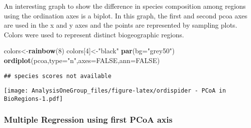 \documentclass[]{article}
\newenvironment{Shaded}{\begin{snugshade}}{\end{snugshade}}
\newcommand{\DataTypeTok}[1]{\textcolor[rgb]{0.13,0.29,0.53}{#1}}
\newcommand{\DecValTok}[1]{\textcolor[rgb]{0.00,0.00,0.81}{#1}}
\newcommand{\FloatTok}[1]{\textcolor[rgb]{0.00,0.00,0.81}{#1}}
\newcommand{\KeywordTok}[1]{\textcolor[rgb]{0.13,0.29,0.53}{\textbf{#1}}}
\newcommand{\NormalTok}[1]{#1}
\newcommand{\OperatorTok}[1]{\textcolor[rgb]{0.81,0.36,0.00}{\textbf{#1}}}
\newcommand{\OtherTok}[1]{\textcolor[rgb]{0.56,0.35,0.01}{#1}}
\newcommand{\StringTok}[1]{\textcolor[rgb]{0.31,0.60,0.02}{#1}}
\begin{document}
An interesting graph to show the difference in species composition among
regions using the ordination axes is a biplot. In this graph, the first
and second pcoa axes are used in the x and y axes and the points are
represented by sampling plots. Colors were used to represent distinct
biogeographic regions.

\begin{Shaded}
\begin{Highlighting}[]
\NormalTok{colors<-}\KeywordTok{rainbow}\NormalTok{(}\DecValTok{8}\NormalTok{)}
\NormalTok{colors[}\DecValTok{4}\NormalTok{]<-}\StringTok{"black"}  
\KeywordTok{par}\NormalTok{(}\DataTypeTok{bg=}\StringTok{"grey50"}\NormalTok{)}
\KeywordTok{ordiplot}\NormalTok{(pcoa,}\DataTypeTok{type=}\StringTok{"n"}\NormalTok{,}\DataTypeTok{axes=}\OtherTok{FALSE}\NormalTok{,}\DataTypeTok{ann=}\OtherTok{FALSE}\NormalTok{)}
\end{Highlighting}
\end{Shaded}

\begin{verbatim}
## species scores not available
\end{verbatim}

\begin{Shaded}
\end{Shaded}

\texttt{[image: AnalysisOneGroup\_files/figure-latex/ordispider - PCoA in BioRegions-1.pdf]}

\hypertarget{multiple-regression-using-first-pcoa-axis}{%
\subsubsection{Multiple Regression using first PCoA
axis}\label{multiple-regression-using-first-pcoa-axis}}
\end{document}
